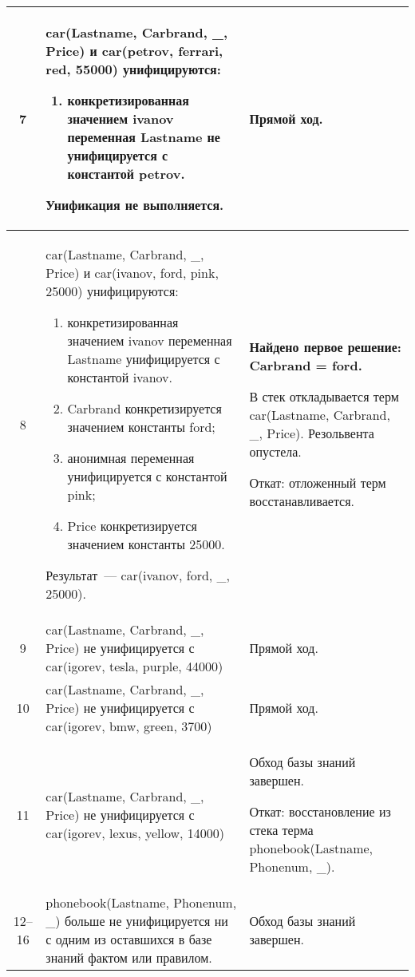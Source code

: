 \begin{longtable}{|c|p{}|p{}|}
        7 & car(Lastname, Carbrand, \_, Price) и car(petrov, ferrari, red,    55000) унифицируются:
        \begin{enumerate}[label=\arabic*)]
            \item конкретизированная значением ivanov переменная Lastname не унифицируется с константой petrov.
        \end{enumerate}
          Унификация не выполняется. &
          Прямой ход. \\ \hline

        8 & car(Lastname, Carbrand, \_, Price) и car(ivanov, ford, pink, 25000) унифицируются:
        \begin{enumerate}[label=\arabic*)]
            \item конкретизированная значением ivanov переменная Lastname унифицируется с константой ivanov.
            \item Carbrand конкретизируется значением константы ford;
            \item анонимная переменная унифицируется с константой pink;
            \item Price конкретизируется значением константы 25000.
        \end{enumerate}
        Результат~--- car(ivanov, ford, \_, 25000). &

        \textbf{Найдено первое решение: Carbrand = ford.}

        В стек откладывается терм car(Lastname, Carbrand, \_, Price). Резольвента опустела.

        Откат: отложенный терм восстанавливается. \\ \hline

        9 & car(Lastname, Carbrand, \_, Price) не унифицируется с car(igorev, tesla,   purple, 44000) & Прямой ход. \\ \hline

        10 & car(Lastname, Carbrand, \_, Price) не унифицируется с car(igorev, bmw,   green, 3700) & Прямой ход. \\ \hline

        11 & car(Lastname, Carbrand, \_, Price) не унифицируется с car(igorev, lexus,   yellow, 14000) & Обход базы знаний завершен.

        Откат: восстановление из стека терма phonebook(Lastname, Phonenum, \_). \\ \hline

        12--16 & phonebook(Lastname, Phonenum, \_) больше не унифицируется ни с одним из оставшихся в базе знаний фактом или правилом. & Обход базы знаний завершен.


\end{longtable}
